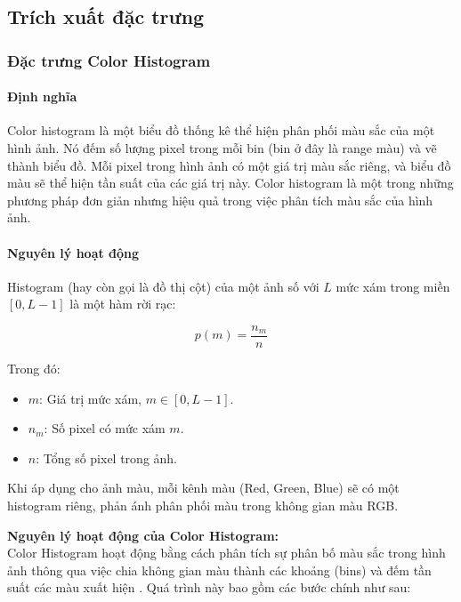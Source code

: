 \documentclass[a4paper,12pt]{article}
\begin{document}
\subsection{Trích xuất đặc trưng}

\subsubsection{Đặc trưng Color Histogram}

\paragraph{Định nghĩa}
\hspace{5mm}Color histogram là một biểu đồ thống kê thể hiện phân phối màu sắc của một hình ảnh. Nó đếm số lượng pixel trong mỗi bin (bin ở đây là range màu) và vẽ thành biểu đồ. Mỗi pixel trong hình ảnh có một giá trị màu sắc riêng, và biểu đồ màu sẽ thể hiện tần suất của các giá trị này. Color histogram là một trong những phương pháp đơn giản nhưng hiệu quả trong việc phân tích màu sắc của hình ảnh.

\paragraph{Nguyên lý hoạt động}
\hspace{5mm}Histogram (hay còn gọi là đồ thị cột) của một ảnh số với \(L\) mức xám trong miền \([0, L-1]\) \cite{imageprocessing2019digital} là một hàm rời rạc:

\[
p(m) = \frac{n_m}{n}
\]

Trong đó:
\begin{itemize}
    \item \(m\): Giá trị mức xám, \(m \in [0, L-1]\).
    \item \(n_m\): Số pixel có mức xám \(m\).
    \item \(n\): Tổng số pixel trong ảnh.
\end{itemize}

Khi áp dụng cho ảnh màu, mỗi kênh màu (Red, Green, Blue) sẽ có một histogram riêng, phản ánh phân phối màu trong không gian màu RGB.

\vspace{0.5cm}
\noindent\textbf{Nguyên lý hoạt động của Color Histogram:} \\[0.15cm]
Color Histogram hoạt động bằng cách phân tích sự phân bố màu sắc trong hình ảnh thông qua việc chia không gian màu thành các khoảng (bins) và đếm tần suất các màu xuất hiện \cite{zilliz_color_histogram}. Quá trình này bao gồm các bước chính như sau:
\end{document}
